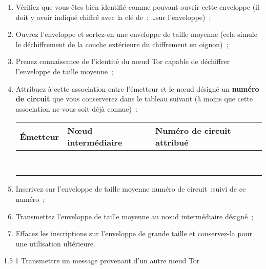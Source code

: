 \documentclass[a4paper,twoside,french]{article}
\makeatletter
\renewcommand\section{\@startsection
  {section}{1}{1cm}%
  {1.5\baselineskip}%
  {1\baselineskip}%
  {\normalfont\Large\bfseries}}%
\makeatother
\begin{document}
  \begin{enumerate}
  \item Vérifiez que vous êtes bien identifié comme pouvant ouvrir
    cette enveloppe (il doit y avoir indiqué \og chiffré avec la clé
    de~: \ldots\fg sur l'enveloppe)~;
  \item Ouvrez l'enveloppe et sortez-en une enveloppe de taille
    moyenne (cela simule le déchiffrement de la couche extérieure du
    chiffrement en oignon)~;
  \item Prenez connaissance de l'identité du n\oe ud Tor capable de
    déchiffrer l'enveloppe de taille moyenne~;
  \item Attribuez à cette association entre l'émetteur et le n\oe ud
    désigné un \textbf{numéro de circuit} que vous conserverez dans le
    tableau suivant (à moins que cette association ne vous soit déjà
    connue)~:
    \begin{center}
      \begin{tabular}{|m{3cm}|m{3cm}|m{4cm}|}
        \hline
        Émetteur & N\oe ud intermédiaire &  Numéro de circuit attribué \\
        \hline
        & & \\
        & & \\
        \hline
        & & \\
        & & \\
        \hline
        & & \\
        & & \\
        \hline
        & & \\
        & & \\
        \hline
      \end{tabular}
    \end{center}
  \item Inscrivez sur l'enveloppe de taille moyenne \og numéro de
    circuit~:\fg suivi de ce numéro~;
  \item Transmettez l'enveloppe de taille moyenne au n\oe ud
    intermédiaire désigné~;
  \item Effacez les inscriptions sur l'enveloppe de grande taille et
    conservez-la pour une utilisation ultérieure.
  \end{enumerate}


  \section{Transmettre un message provenant d'un autre n\oe ud Tor}
\end{document}
